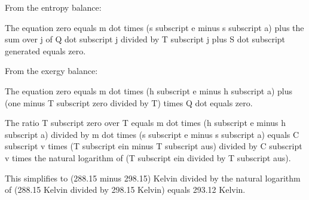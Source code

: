 From the entropy balance:

The equation zero equals m dot times (s subscript e minus s subscript a) plus the sum over j of Q dot subscript j divided by T subscript j plus S dot subscript generated equals zero.

From the exergy balance:

The equation zero equals m dot times (h subscript e minus h subscript a) plus (one minus T subscript zero divided by T) times Q dot equals zero.

The ratio T subscript zero over T equals m dot times (h subscript e minus h subscript a) divided by m dot times (s subscript e minus s subscript a) equals C subscript v times (T subscript ein minus T subscript aus) divided by C subscript v times the natural logarithm of (T subscript ein divided by T subscript aus).

This simplifies to (288.15 minus 298.15) Kelvin divided by the natural logarithm of (288.15 Kelvin divided by 298.15 Kelvin) equals 293.12 Kelvin.